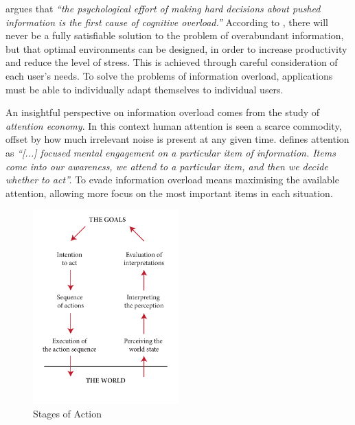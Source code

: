 \cite{Kirsh2000} argues that 
\emph{``the psychological effort of making hard decisions about \emph{pushed} information is the first cause of cognitive overload.''} 
According to \citeauthor{Kirsh2000}, there will never be a fully satisfiable solution to the problem of overabundant information, 
but that optimal environments can be designed,
in order to increase productivity and reduce the level of stress.
This is achieved through careful consideration of each user's needs. 
To solve the problems of information overload, 
applications must be able to individually adapt themselves to individual users. 

An insightful perspective on information overload comes from the study of \emph{attention economy}. 
In this context human attention is seen a scarce commodity, offset by how much irrelevant noise is present at any given time. 
\citet[p.1]{Davenport2001} defines attention as \emph{``[...] focused mental engagement on a particular item of information. 
Items come into our awareness, we attend to a particular item, and then we decide whether to act''.} 
To evade information overload means maximising the available attention, allowing more focus on the most important items in each situation.

\begin{figure}
  \vspace{-20pt}
  \begin{center}
    \includegraphics[width=0.5\textwidth]{../graphics/seven-stages.pdf}
    \vspace{-20pt}
    \caption[The Seven Stages of Action]{Stages of Action}
  \end{center}
  \label{fig:seven-stages}
  \vspace{-20pt}
\end{figure}

